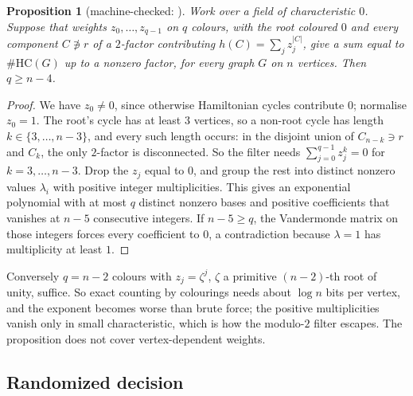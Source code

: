 \documentclass[11pt]{amsart}
\theoremstyle{plain}
\newtheorem{proposition}[theorem]{Proposition}
\theoremstyle{definition}
\theoremstyle{remark}
\numberwithin{equation}{section}
\newcommand{\HC}{\#\mathrm{HC}}
\begin{document}
\begin{proposition}[machine-checked: ]\label{prop:colouring-barrier}
Work over a field of characteristic $0$. Suppose that weights $z_0,\dots,z_{q-1}$ on $q$ colours,
with the root coloured $0$ and every component $C\not\ni r$ of a $2$-factor contributing
$h(C)=\sum_jz_j^{|C|}$, give a sum equal to $\HC(G)$ up to a nonzero factor, for every graph $G$
on $n$ vertices. Then $q\ge n-4$.
\end{proposition}

\begin{proof}
We have $z_0\ne0$, since otherwise Hamiltonian cycles contribute $0$; normalise $z_0=1$. The root's
cycle has at least $3$ vertices, so a non-root cycle has length $k\in\{3,\dots,n-3\}$, and every
such length occurs: in the disjoint union of $C_{n-k}\ni r$ and $C_k$, the only $2$-factor is
disconnected. So the filter needs $\sum_{j=0}^{q-1}z_j^k=0$ for $k=3,\dots,n-3$. Drop the $z_j$
equal to $0$, and group the rest into distinct nonzero values $\lambda_i$ with positive integer
multiplicities. This gives an exponential polynomial with at most $q$ distinct nonzero bases and
positive coefficients that vanishes at $n-5$ consecutive integers. If $n-5\ge q$, the
Vandermonde matrix on those integers forces every coefficient to $0$, a contradiction because
$\lambda=1$ has multiplicity at least $1$.
\end{proof}

Conversely $q=n-2$ colours with $z_j=\zeta^j$, $\zeta$ a primitive $(n-2)$-th root of unity,
suffice. So exact counting by colourings needs about $\log n$ bits per vertex, and the exponent
becomes worse than brute force; the positive multiplicities vanish only in small characteristic,
which is how the modulo-$2$ filter escapes. The proposition does not cover vertex-dependent
weights.

\subsection{Randomized decision}
\end{document}

